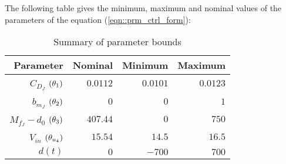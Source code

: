 The following table gives the minimum, maximum and nominal values of the parameters of the equation (\ref{eqn::prm_ctrl_form}):

\begin{table}[H]
    \centering
    \begin{tabular}{r r r r}
        \hline \hline
        Parameter &Nominal & Minimum & Maximum \\ \hline \hline
        $C_{D_J}$ $\left( \theta_1 \right)$&
        $0.0112$              &
        $0.0101$              &
        $0.0123$

        \\
        $b_{m_J}$ $\left( \theta_2 \right)$&
        $0$                      &
        $0$                      &
        $1$
        \\
        $M_{f_J} - d_0$ $\left( \theta_3 \right)$ &
        $407.44$                   &
        $0$                             &
        $750$
        \\
        $V_{in}$ $\left( \theta_{u_4} \right)$ &
        $15.54$                     &
        $14.5$                      &
        $16.5$
        \\
        $d(t)$                   &
        $0$                      &
        $-700$                   &
        $700$
        \\
        \hline \hline
    \end{tabular}
    \caption{Summary of parameter bounds}
    \label{tab::parm_bounds}
\end{table}
